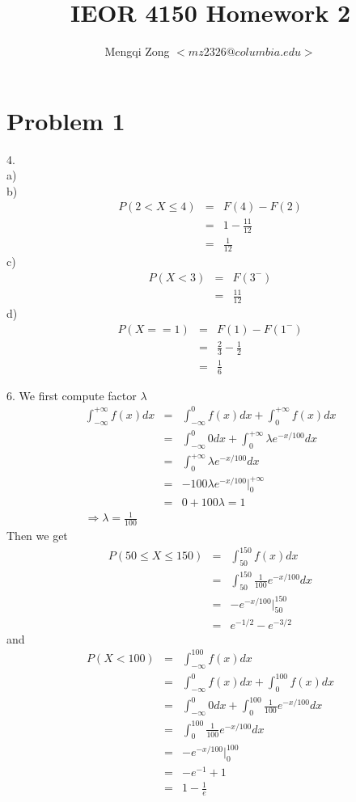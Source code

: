 \documentclass[12pt]{article}
\title{IEOR 4150 Homework 2}
\author{Mengqi Zong $<mz2326@columbia.edu>$}
\begin{document}
\maketitle

\setlength{\parindent}{0in}

\section*{Problem 1}
4. \\
a) \\
b)
\begin{eqnarray*}
  P(2 < X \le 4)
  &=& F(4) - F(2) \\
  &=& 1 - \frac {11}{12} \\
  &=& \frac {1}{12}
\end{eqnarray*}
c)
\begin{eqnarray*}
  P(X < 3)
  &=& F(3^-) \\
  &=& \frac {11}{12}
\end{eqnarray*}
d)
\begin{eqnarray*}
  P(X == 1)
  &=& F(1) - F(1^-) \\
  &=& \frac {2}{3} - \frac {1}{2} \\
  &=& \frac {1}{6}
\end{eqnarray*}

6. We first compute factor $\lambda$
\begin{eqnarray*}
  \int_{-\infty}^{+\infty} f(x) dx
  &=& \int_{-\infty}^{0} f(x) dx + \int_{0}^{+\infty} f(x) dx \\
  &=& \int_{-\infty}^{0} 0 dx + \int_{0}^{+\infty} \lambda e^{-x/100} dx \\
  &=& \int_{0}^{+\infty} \lambda e^{-x/100} dx \\
  &=& -100 \lambda e^{-x/100}|_0^{+\infty} \\
  &=& 0 + 100 \lambda = 1 \\
  \Longrightarrow \lambda = \frac {1}{100}
\end{eqnarray*}
Then we get
\begin{eqnarray*}
  P(50 \le X \le 150)
  &=& \int_{50}^{150} f(x) dx \\
  &=& \int_{50}^{150} \frac {1}{100} e^{-x/100} dx \\
  &=& -e^{-x/100}|_{50}^{150} \\
  &=& e^{-1/2}-e^{-3/2}
\end{eqnarray*}
and
\begin{eqnarray*}
  P(X < 100)
  &=& \int_{-\infty}^{100} f(x) dx \\
  &=& \int_{-\infty}^{0} f(x) dx + \int_{0}^{100} f(x) dx \\
  &=& \int_{-\infty}^{0} 0 dx + \int_{0}^{100} \frac {1}{100} e^{-x/100} dx \\
  &=& \int_{0}^{100} \frac {1}{100} e^{-x/100} dx \\
  &=& -e^{-x/100}|_0^{100} \\
  &=& -e^{-1} + 1 \\
  &=& 1 - \frac {1}{e}
\end{eqnarray*}
\end{document}
